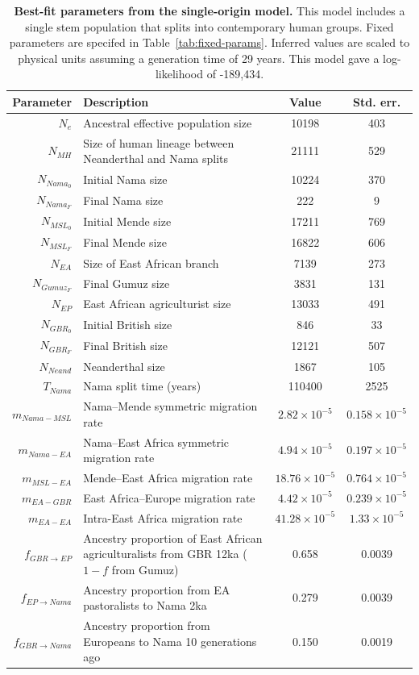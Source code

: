 \documentclass[]{article}
\begin{document}
\begin{table}[ht]
\caption{
    \label{tab:supp-single-origin}
    \textbf{Best-fit parameters from the single-origin model.}
    This model includes a single stem population that splits into contemporary human
    groups. Fixed parameters are specifed in Table~\ref{tab:fixed-params}.
    Inferred values are scaled to physical units assuming a generation time of
    29 years. This model gave a log-likelihood of -189,434.
}
\centering
\begin{tabular}[t]{rP{8cm}cc}
    \toprule
    Parameter & Description & Value & Std. err.\\
    \midrule
    $N_e$ & Ancestral effective population size & 10198 & 403 \\
    $N_{MH}$ & Size of human lineage between Neanderthal and Nama splits & 21111 & 529 \\
    $N_{Nama_0}$ & Initial Nama size & 10224 & 370 \\
    $N_{Nama_F}$ & Final Nama size & 222 & 9 \\
    $N_{MSL_0}$ & Initial Mende size & 17211 & 769 \\
    $N_{MSL_F}$ & Final Mende size & 16822 & 606 \\
    $N_{EA}$ & Size of East African branch & 7139 & 273 \\
    $N_{Gumuz_F}$ & Final Gumuz size & 3831 & 131 \\
    $N_{EP}$ & East African agriculturist size & 13033 & 491 \\
    $N_{GBR_0}$ & Initial British size & 846 & 33 \\
    $N_{GBR_F}$ & Final British size & 12121 & 507 \\
    $N_{Neand}$ & Neanderthal size & 1867 & 105 \\
    $T_{Nama}$ & Nama split time (years) & 110400 & 2525 \\
    $m_{Nama-MSL}$ & Nama--Mende symmetric migration rate & $2.82\times10^{-5}$ & $0.158\times10^{-5}$ \\
    $m_{Nama-EA}$ & Nama--East Africa symmetric migration rate & $4.94\times10^{-5}$ & $0.197\times10^{-5}$ \\
    $m_{MSL-EA}$ & Mende--East Africa migration rate & $18.76\times10^{-5}$ & $0.764\times10^{-5}$ \\
    $m_{EA-GBR}$ & East Africa--Europe migration rate & $4.42\times10^{-5}$ & $0.239\times10^{-5}$ \\
    $m_{EA-EA}$ & Intra-East Africa migration rate & $41.28\times10^{-5}$ & $1.33\times10^{-5}$ \\
    $f_{GBR \rightarrow EP}$ & Ancestry proportion of East African agriculturalists from GBR 12ka ($1-f$ from Gumuz) & 0.658 & 0.0039 \\
    $f_{EP \rightarrow Nama}$ & Ancestry proportion from EA pastoralists to Nama 2ka & 0.279 & 0.0039 \\
    $f_{GBR \rightarrow Nama}$ & Ancestry proportion from Europeans to Nama 10 generations ago & 0.150 & 0.0019 \\
    \bottomrule
\end{tabular}
\end{table}
\end{document}
